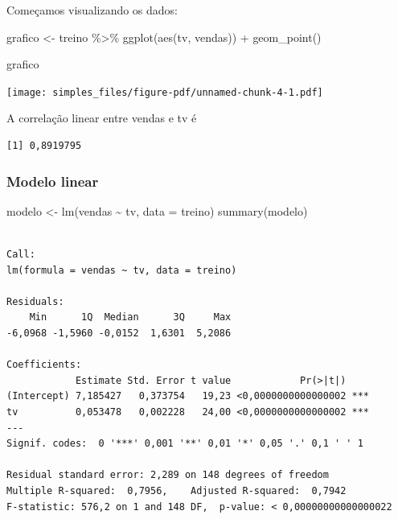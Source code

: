 \documentclass[
  letterpaper,
  DIV=11,
  numbers=noendperiod]{scrreprt}
\newenvironment{Shaded}{\begin{snugshade}}{\end{snugshade}}
\newcommand{\AttributeTok}[1]{\textcolor[rgb]{0.40,0.45,0.13}{#1}}
\newcommand{\FunctionTok}[1]{\textcolor[rgb]{0.28,0.35,0.67}{#1}}
\newcommand{\NormalTok}[1]{\textcolor[rgb]{0.00,0.23,0.31}{#1}}
\newcommand{\OtherTok}[1]{\textcolor[rgb]{0.00,0.23,0.31}{#1}}
\newcommand{\SpecialCharTok}[1]{\textcolor[rgb]{0.37,0.37,0.37}{#1}}
\begin{document}
Começamos visualizando os dados:

\begin{Shaded}
\begin{Highlighting}[]
\NormalTok{grafico }\OtherTok{\textless{}{-}}\NormalTok{ treino }\SpecialCharTok{\%\textgreater{}\%} 
  \FunctionTok{ggplot}\NormalTok{(}\FunctionTok{aes}\NormalTok{(tv, vendas)) }\SpecialCharTok{+}
    \FunctionTok{geom\_point}\NormalTok{()}

\NormalTok{grafico}
\end{Highlighting}
\end{Shaded}

\begin{center}
\texttt{[image: simples\_files/figure-pdf/unnamed-chunk-4-1.pdf]}
\end{center}

A correlação linear entre vendas e tv é

\begin{Shaded}
\end{Shaded}

\begin{verbatim}
[1] 0,8919795
\end{verbatim}

\subsubsection{Modelo linear}\label{lm-vendas-tv}

\begin{Shaded}
\begin{Highlighting}[]
\NormalTok{modelo }\OtherTok{\textless{}{-}} \FunctionTok{lm}\NormalTok{(vendas }\SpecialCharTok{\textasciitilde{}}\NormalTok{ tv, }\AttributeTok{data =}\NormalTok{ treino)}
\FunctionTok{summary}\NormalTok{(modelo)}
\end{Highlighting}
\end{Shaded}

\begin{verbatim}

Call:
lm(formula = vendas ~ tv, data = treino)

Residuals:
    Min      1Q  Median      3Q     Max 
-6,0968 -1,5960 -0,0152  1,6301  5,2086 

Coefficients:
            Estimate Std. Error t value            Pr(>|t|)    
(Intercept) 7,185427   0,373754   19,23 <0,0000000000000002 ***
tv          0,053478   0,002228   24,00 <0,0000000000000002 ***
---
Signif. codes:  0 '***' 0,001 '**' 0,01 '*' 0,05 '.' 0,1 ' ' 1

Residual standard error: 2,289 on 148 degrees of freedom
Multiple R-squared:  0,7956,    Adjusted R-squared:  0,7942 
F-statistic: 576,2 on 1 and 148 DF,  p-value: < 0,00000000000000022
\end{verbatim}
\end{document}
